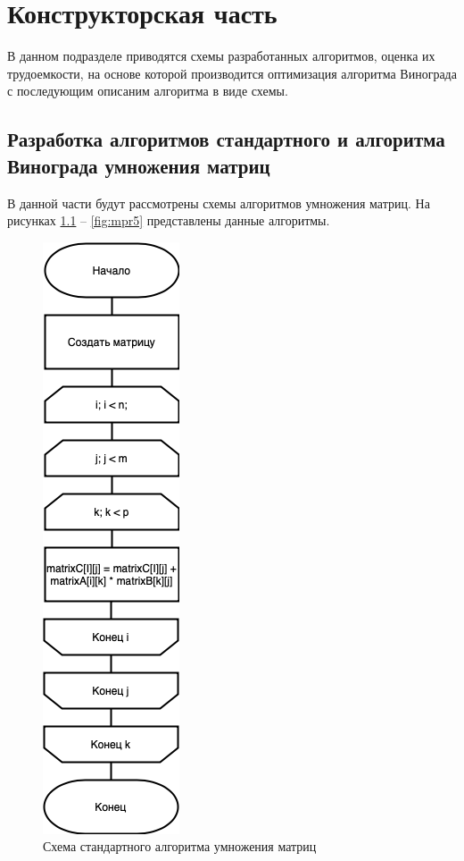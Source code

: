 \chapter{Конструкторская часть}

В данном подразделе приводятся схемы разработанных алгоритмов, оценка их
трудоемкости, на основе которой производится оптимизация алгоритма Винограда с
последующим описаним алгоритма в виде схемы.

\section{Разработка алгоритмов стандартного и алгоритма Винограда умножения матриц}

В данной части будут рассмотрены схемы алгоритмов умножения матриц. На рисунках \ref{fig:mpr} -- \ref{fig:mpr5}
представлены данные алгоритмы.
\begin{figure}[h]
    \centering
    \includegraphics[width=0.18\linewidth]{img/standartAlg.png}
    \caption{Схема стандартного алгоритма умножения матриц}
    \label{fig:mpr}
\end{figure}

